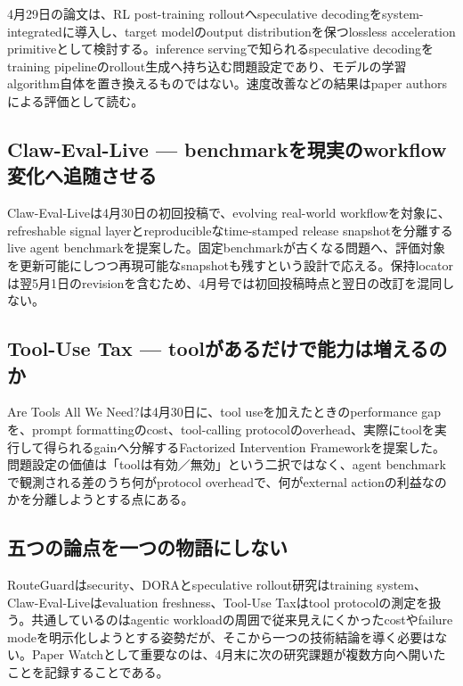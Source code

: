 4月29日の論文は、RL post-training rolloutへspeculative decodingをsystem-integratedに導入し、target modelのoutput distributionを保つlossless acceleration primitiveとして検討する。inference servingで知られるspeculative decodingをtraining pipelineのrollout生成へ持ち込む問題設定であり、モデルの学習algorithm自体を置き換えるものではない。速度改善などの結果はpaper authorsによる評価として読む。\autocite{src-8e578daed9ed}


\begingroup\raggedright
\subsection{Claw-Eval-Live — benchmarkを現実のworkflow変化へ追随させる}
\par\endgroup

Claw-Eval-Liveは4月30日の初回投稿で、evolving real-world workflowを対象に、refreshable signal layerとreproducibleなtime-stamped release snapshotを分離するlive agent benchmarkを提案した。固定benchmarkが古くなる問題へ、評価対象を更新可能にしつつ再現可能なsnapshotも残すという設計で応える。保持locatorは翌5月1日のrevisionを含むため、4月号では初回投稿時点と翌日の改訂を混同しない。\autocite{src-841d4b563b9d}


\begingroup\raggedright
\subsection{Tool-Use Tax — toolがあるだけで能力は増えるのか}
\par\endgroup

Are Tools All We Need?は4月30日に、tool useを加えたときのperformance gapを、prompt formattingのcost、tool-calling protocolのoverhead、実際にtoolを実行して得られるgainへ分解するFactorized Intervention Frameworkを提案した。問題設定の価値は「toolは有効／無効」という二択ではなく、agent benchmarkで観測される差のうち何がprotocol overheadで、何がexternal actionの利益なのかを分離しようとする点にある。\autocite{src-56e226358d6f}


\begingroup\raggedright
\subsection{五つの論点を一つの物語にしない}
\par\endgroup

RouteGuardはsecurity、DORAとspeculative rollout研究はtraining system、Claw-Eval-Liveはevaluation freshness、Tool-Use Taxはtool protocolの測定を扱う。共通しているのはagentic workloadの周囲で従来見えにくかったcostやfailure modeを明示化しようとする姿勢だが、そこから一つの技術結論を導く必要はない。Paper Watchとして重要なのは、4月末に次の研究課題が複数方向へ開いたことを記録することである。\autocite{src-0d99a9f2485e,src-56e226358d6f,src-6bd60c76cba7,src-841d4b563b9d,src-8e578daed9ed}


